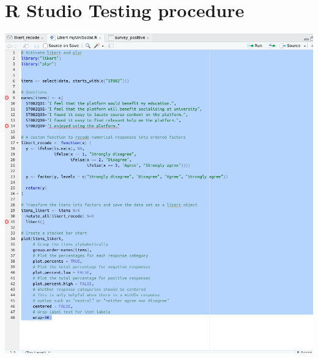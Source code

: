\documentclass[lettersize,journal]{IEEEtran}
\begin{document}
\section{R Studio Testing procedure}
\includegraphics[width=\textwidth]{R.png}
\newpage
\clearpage
\twocolumn
\end{document}
